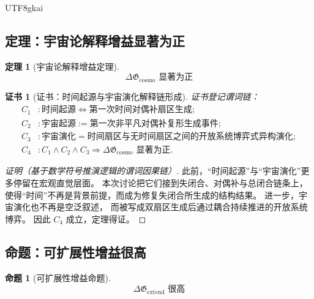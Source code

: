 \documentclass[12pt]{article}
\newtheorem{theorem}{定理}[section]
\newtheorem{proposition}{命题}[section]
\newtheorem{Certificate}{证书}[section]
\begin{document}
\begin{CJK*}{UTF8}{gkai}
\subsection{定理：宇宙论解释增益显著为正}
\label{subsec:tex43-ch11-theorem-cosmo}

\begin{theorem}[宇宙论解释增益定理]
\label{thm:tex43-gain-cosmo}
\[
  \boxed{
    \Delta \mathfrak G_{\mathrm{cosmo}} \text{ 显著为正}
  }
\]
\end{theorem}

\begin{Certificate}[证书：时间起源与宇宙演化解释链形成]
\label{cert:tex43-gain-cosmo}
证书登记谓词链：
\[
\begin{aligned}
  C_1 &: \text{时间起源}
         \iff
         \text{第一次时间对偶补扇区生成};\\
  C_2 &: \text{宇宙起源}
         :=
         \text{第一次非平凡对偶补复形生成事件};\\
  C_3 &: \text{宇宙演化}
         =
         \text{时间扇区与无时间扇区之间的开放系统博弈式异构演化};\\
  C_4 &: C_1\wedge C_2\wedge C_3
         \Rightarrow
         \Delta \mathfrak G_{\mathrm{cosmo}} \text{ 显著为正}.
\end{aligned}
\]
\end{Certificate}

\begin{proof}[证明（基于数学符号推演逻辑的谓词因果链）]
此前，“时间起源”与“宇宙演化”更多停留在宏观直觉层面。
本次讨论把它们接到失闭合、对偶补与总闭合链条上，
使得“时间”不再是背景前提，而成为修复失闭合所生成的结构结果。
进一步，宇宙演化也不再是空泛叙述，
而被写成双扇区生成后通过耦合持续推进的开放系统博弈。
因此 $C_4$ 成立，定理得证。
\end{proof}

\subsection{命题：可扩展性增益很高}
\label{subsec:tex43-ch11-proposition-extend}

\begin{proposition}[可扩展性增益命题]
\label{prop:tex43-gain-extend}
\[
  \boxed{
    \Delta \mathfrak G_{\mathrm{extend}} \text{ 很高}
  }
\]
\end{proposition}


\end{CJK*}
\end{document}
